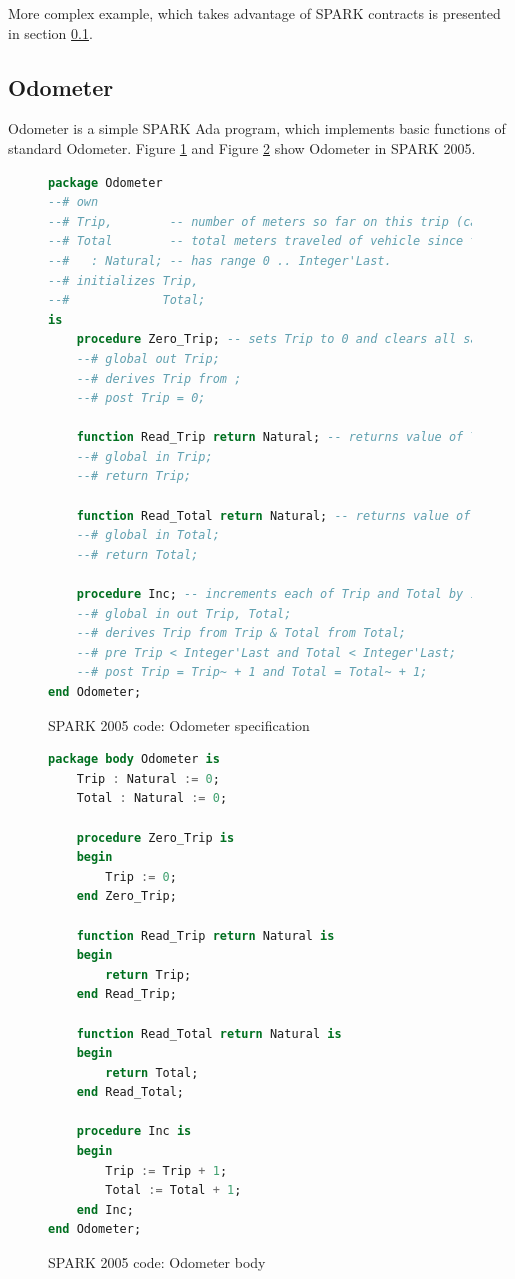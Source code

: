 More complex example, which takes advantage of SPARK contracts is presented in section \ref{pcapumpimpl:beagleboard:odometer}.

\subsection{Odometer}
\label{pcapumpimpl:beagleboard:odometer}

Odometer is a simple SPARK Ada program, which implements basic functions of standard Odometer. Figure \ref{listing:Odometer2005_spec} and Figure \ref{listing:Odometer2005_body} show Odometer in SPARK 2005.

\begin{figure}
\singlespacing
\begin{lstlisting}[language=ada, frame=single, gobble=0]
package Odometer
--# own
--# Trip,        -- number of meters so far on this trip (can be reset to 0).
--# Total        -- total meters traveled of vehicle since the last factory-reset.
--#   : Natural; -- has range 0 .. Integer'Last.
--# initializes Trip,
--#             Total;
is
    procedure Zero_Trip; -- sets Trip to 0 and clears all saved Trip marks.
    --# global out Trip;
    --# derives Trip from ;
    --# post Trip = 0;
    
    function Read_Trip return Natural; -- returns value of Trip.
    --# global in Trip;
    --# return Trip;
    
    function Read_Total return Natural; -- returns value of Total
    --# global in Total;
    --# return Total;
    
    procedure Inc; -- increments each of Trip and Total by 1.
    --# global in out Trip, Total;
    --# derives Trip from Trip & Total from Total;
    --# pre Trip < Integer'Last and Total < Integer'Last;
    --# post Trip = Trip~ + 1 and Total = Total~ + 1;	    
end Odometer;
\end{lstlisting} 
\doublespacing
\caption{SPARK 2005 code: Odometer specification}
\label{listing:Odometer2005_spec}
\end{figure}

\begin{figure}
\singlespacing
\begin{lstlisting}[language=ada, frame=single, gobble=0]
package body Odometer is
    Trip : Natural := 0;
    Total : Natural := 0;
    
    procedure Zero_Trip is
    begin
        Trip := 0;
    end Zero_Trip;
    
    function Read_Trip return Natural is
    begin
        return Trip;
    end Read_Trip;
    
    function Read_Total return Natural is
    begin
        return Total;
    end Read_Total;
    
    procedure Inc is
    begin
        Trip := Trip + 1;
        Total := Total + 1;
    end Inc;
end Odometer;
\end{lstlisting} 
\doublespacing
\caption{SPARK 2005 code: Odometer body}
\label{listing:Odometer2005_body}
\end{figure}


